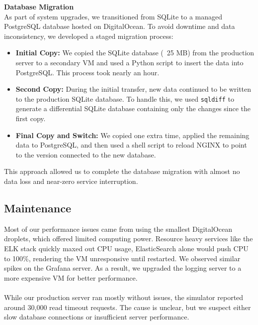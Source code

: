 \noindent \textbf{Database Migration}
\\
As part of system upgrades, we transitioned from SQLite to a managed PostgreSQL database hosted on DigitalOcean. To avoid downtime and data inconsistency, we developed a staged migration process:
\begin{itemize}
    \item \textbf{Initial Copy:} We copied the SQLite database (~25 MB) from the production server to a secondary VM and used a Python script to insert the data into PostgreSQL. This process took nearly an hour.
    \item \textbf{Second Copy:} During the initial transfer, new data continued to be written to the production SQLite database. To handle this, we used \texttt{sqldiff} to generate a differential SQLite database containing only the changes since the first copy.
    \item \textbf{Final Copy and Switch:} We copied one extra time, applied the remaining data to PostgreSQL, and then used a shell script to reload NGINX to point to the version connected to the new database.
\end{itemize}

This approach allowed us to complete the database migration with almost no data loss and near-zero service interruption.

\subsection{Maintenance}

Most of our performance issues came from using the smallest DigitalOcean droplets, which offered limited computing power. Resource heavy services like the ELK stack quickly maxed out CPU usage, ElasticSearch alone would push CPU to 100\%, rendering the VM unresponsive until restarted. We observed similar spikes on the Grafana server. As a result, we upgraded the logging server to a more expensive VM for better performance.
\\
\\
While our production server ran mostly without issues, the simulator reported around 30,000 read timeout requests. The cause is unclear, but we suspect either slow database connections or insufficient server performance.

